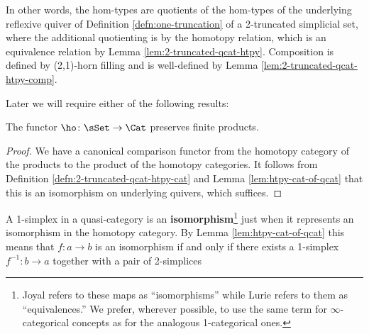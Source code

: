 
In other words, the hom-types are quotients of the hom-types of the underlying reflexive quiver of Definition \ref{defn:one-truncation} of a 2-truncated simplicial set, where the additional quotienting is by the homotopy relation, which is an equivalence relation by Lemma \ref{lem:2-truncated-qcat-htpy}. Composition is defined by (2,1)-horn filling and is well-defined by Lemma \ref{lem:2-truncated-qcat-htpy-comp}.



Later we will require either of the following results:



\begin{lemma}\label{lem:ho-preserves-small-products}
   The functor $\ho \colon \sSet \to \Cat$ preserves finite products.
 \end{lemma}
\begin{proof}
  We have a canonical comparison functor from the homotopy category of the products to the product of the homotopy categories. It follows from Definition \ref{defn:2-truncated-qcat-htpy-cat} and Lemma \ref{lem:htpy-cat-of-qcat} that this is an isomorphism on underlying quivers, which suffices.
\end{proof}


   \begin{definition}\label{defn:isomorphism}
     A 1-simplex in a quasi-category is an \textbf{isomorphism}\footnote{Joyal refers to these maps as ``isomorphisms'' while Lurie refers to them as ``equivalences.'' We prefer, wherever possible, to use the same term for $\infty$-categorical concepts as for the analogous 1-categorical ones.} just when it represents an isomorphism in the homotopy category. By Lemma \ref{lem:htpy-cat-of-qcat} this means that $f \colon a \to b$ is an isomorphism if and only if there exists a 1-simplex $f^{-1} \colon b \to a$ together with a pair of 2-simplices
   \begin{center}
   \end{center}
   \end{definition}

